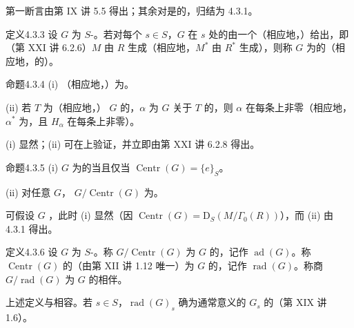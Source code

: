 第一断言由第 IX 讲 5.5 得出；其余对是的，归结为 4.3.1。
\begin{SGAresult}{定义}{4.3.3} 设 $G$ 为 $S$-。若对每个 $s\in S$，$G$ 在 $s$ 处的由一个（相应地，）给出，即（第 XXI 讲 6.2.6）$M$ 由 $R$ 生成（相应地，$M^*$ 由 $R^*$ 生成），则称 $G$ 为的（相应地，的）。\end{SGAresult}
\begin{SGAresult}{命题}{4.3.4} (i) （相应地，）为。

(ii) 若 $T$ 为（相应地，） $G$ 的，$\alpha$ 为 $G$ 关于 $T$ 的，则 $\alpha$ 在每条上非零（相应地，$\alpha^*$ 为，且 $H_\alpha$ 在每条上非零）。\end{SGAresult}
(i) 显然；(ii) 可在上验证，并立即由第 XXI 讲 6.2.8 得出。
\begin{SGAresult}{命题}{4.3.5} (i)  $G$ 为的当且仅当 $\operatorname{Centr}(G)=\{e\}_S$。

(ii) 对任意 $G$， $G/\operatorname{Centr}(G)$ 为。\end{SGAresult}
可假设 $G$ ，此时 (i) 显然（因 $\operatorname{Centr}(G)=\mathrm D_S(M/\Gamma_0(R))$），而 (ii) 由 4.3.1 得出。
\begin{SGAresult}{定义}{4.3.6} 设 $G$ 为 $S$-。称 $G/\operatorname{Centr}(G)$ 为 $G$ 的，记作 $\operatorname{ad}(G)$。称 $\operatorname{Centr}(G)$ 的（由第 XII 讲 1.12 唯一）为 $G$ 的，记作 $\operatorname{rad}(G)$。称商 $G/\operatorname{rad}(G)$ 为 $G$ 的相伴。\end{SGAresult}
上述定义与相容。若 $s\in S$，$\operatorname{rad}(G)_s$ 确为通常意义的 $G_s$ 的（第 XIX 讲 1.6）。


